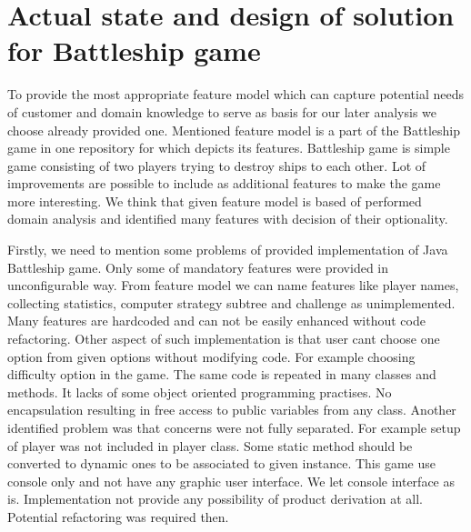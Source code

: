 \documentclass[11pt,slovak,a4paper,twoside]{article}
\begin{document}
\section{Actual state and design of solution for Battleship game} \label{analysis}

To provide the most appropriate feature model which can capture potential needs of customer and domain knowledge to serve as basis for our later analysis we choose already provided one. Mentioned feature model is a part of the Battleship game in one repository for which depicts its features. Battleship game is simple game consisting of two players trying to destroy ships to each other. Lot of improvements are possible to include as additional features to make the game more interesting. We think that given feature model is based of performed domain analysis and identified many features with decision of their optionality.

Firstly, we need to mention some problems of provided implementation of Java Battleship game. Only some of mandatory features were provided in unconfigurable way. From feature model we can name features like player names, collecting statistics, computer strategy subtree and challenge as unimplemented. Many features are hardcoded and can not be easily enhanced without code refactoring. Other aspect of such implementation is that user cant choose one option from given options without modifying code. For example choosing difficulty option in the game. The same code is repeated in many classes and methods. It lacks of some object oriented programming practises. No encapsulation resulting in free access to public variables from any class. Another identified problem was that concerns were not fully separated. For example setup of player was not included in player class. Some static method should be converted to dynamic ones to be associated to given instance. This game use console only and not have any graphic user interface. We let console interface as is. Implementation not provide any possibility of product derivation at all. Potential refactoring was required then. 
\end{document}
